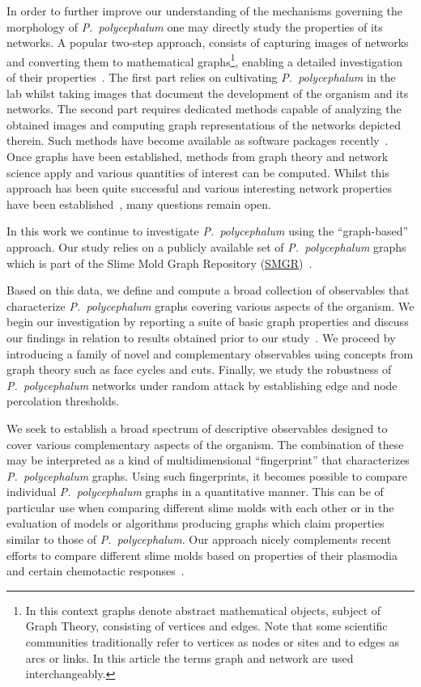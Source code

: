 	In order to further improve our understanding of the mechanisms governing the morphology of \emph{P.~polycephalum} one may directly study the properties of its networks. A popular two-step approach, consists of capturing images of networks and converting them to mathematical graphs\footnote{In this context graphs denote abstract mathematical objects, subject of Graph Theory, consisting of vertices and edges. Note that some scientific communities traditionally refer to vertices as nodes or sites and to edges as arcs or links. In this article the terms graph and network are used interchangeably.}, enabling a detailed investigation of their properties~\cite{baumgarten2012computational}. The first part relies on cultivating \emph{P.~polycephalum} in the lab whilst taking images that document the development of the organism and its networks. The second part requires dedicated methods capable of analyzing the obtained images and computing graph representations of the networks depicted therein. Such methods have become available as software packages recently~\cite{dirnberger2015nefi}. Once graphs have been established, methods from graph theory and network science apply and various quantities of interest can be computed. Whilst this approach has been quite successful and various interesting network properties have been established~\cite{baumgarten2010plasmodial,baumgarten2013functional,ito2011characterization}, many questions remain open.

	In this work we continue to investigate \emph{P.~polycephalum} using the ``graph-based'' approach. Our study relies on a publicly available set of \emph{P.~polycephalum} graphs which is part of the Slime Mold Graph Repository (\href{http://smgr.mpi-inf.mpg.de}{SMGR})~\cite{SMGR}.

	Based on this data, we define and compute a broad collection of observables that characterize \emph{P.~polycephalum} graphs covering various aspects of the organism. We begin our investigation by reporting a suite of basic graph properties and discuss our findings in relation to results obtained prior to our study~\cite{baumgarten2010plasmodial}. We proceed by introducing a family of novel and complementary observables using concepts from graph theory such as face cycles and cuts. Finally, we study the robustness of \emph{P.~polycephalum} networks under random attack by establishing edge and node percolation thresholds. 

	We seek to establish a broad spectrum of descriptive observables designed to cover various complementary aspects of the organism. The combination of these may be interpreted as a kind of multidimensional ``fingerprint'' that characterizes \emph{P.~polycephalum} graphs. Using such fingerprints, it becomes possible to compare individual \emph{P.~polycephalum} graphs in a quantitative manner. This can be of particular use when comparing different slime molds with each other or in the evaluation of models or algorithms producing graphs which claim properties similar to those of \emph{P.~polycephalum}. Our approach nicely complements recent efforts to compare different slime molds based on properties of their plasmodia and certain chemotactic responses~\cite{westendorf2016quantitative}.

